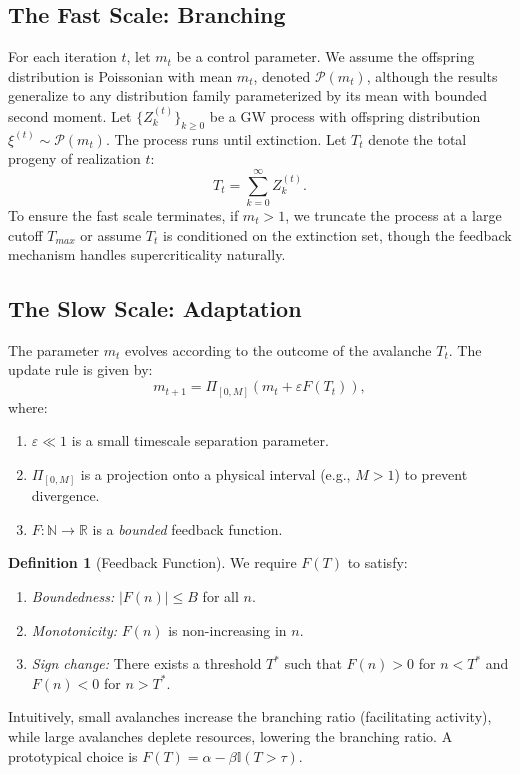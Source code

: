 \documentclass[11pt, a4paper]{article}
\theoremstyle{definition}
\newtheorem{definition}[theorem]{Definition}
\newcommand{\R}{\mathbb{R}}
\newcommand{\N}{\mathbb{N}}
\begin{document}
\subsection{The Fast Scale: Branching}
For each iteration $t$, let $m_t$ be a control parameter. We assume the offspring distribution is Poissonian with mean $m_t$, denoted $\mathcal{P}(m_t)$, although the results generalize to any distribution family parameterized by its mean with bounded second moment.
Let $\{Z_k^{(t)}\}_{k \ge 0}$ be a GW process with offspring distribution $\xi^{(t)} \sim \mathcal{P}(m_t)$. The process runs until extinction. Let $T_t$ denote the total progeny of realization $t$:
\begin{equation}
    T_t = \sum_{k=0}^{\infty} Z_k^{(t)}.
\end{equation}
To ensure the fast scale terminates, if $m_t > 1$, we truncate the process at a large cutoff $T_{max}$ or assume $T_t$ is conditioned on the extinction set, though the feedback mechanism handles supercriticality naturally.

\subsection{The Slow Scale: Adaptation}
The parameter $m_t$ evolves according to the outcome of the avalanche $T_t$. The update rule is given by:
\begin{equation}
    \label{eq:update}
    m_{t+1} = \Pi_{[0, M]} \left( m_t + \varepsilon F(T_t) \right),
\end{equation}
where:
\begin{enumerate}
    \item $\varepsilon \ll 1$ is a small timescale separation parameter.
    \item $\Pi_{[0, M]}$ is a projection onto a physical interval (e.g., $M > 1$) to prevent divergence.
    \item $F: \N \to \R$ is a \textit{bounded} feedback function.
\end{enumerate}

\begin{definition}[Feedback Function]
We require $F(T)$ to satisfy:
\begin{enumerate}
    \item \textit{Boundedness:} $|F(n)| \le B$ for all $n$.
    \item \textit{Monotonicity:} $F(n)$ is non-increasing in $n$.
    \item \textit{Sign change:} There exists a threshold $T^*$ such that $F(n) > 0$ for $n < T^*$ and $F(n) < 0$ for $n > T^*$.
\end{enumerate}
\end{definition}
Intuitively, small avalanches increase the branching ratio (facilitating activity), while large avalanches deplete resources, lowering the branching ratio. A prototypical choice is $F(T) = \alpha - \beta \mathbb{I}(T > \tau)$.
\end{document}
